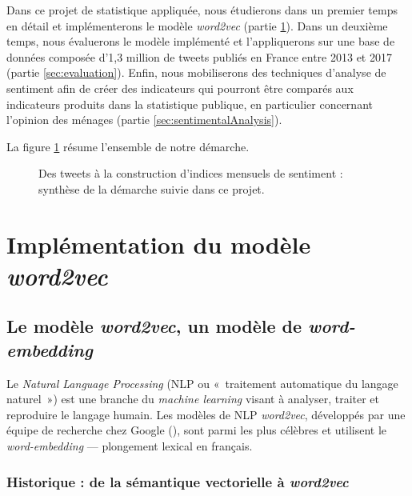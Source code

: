 \documentclass[11pt,french,french]{article}
\begin{document}
Dans ce projet de statistique appliquée, nous étudierons dans un premier
temps en détail et implémenterons le modèle \emph{word2vec} (partie
\ref{sec:word2vec}). Dans un deuxième temps, nous évaluerons le modèle
implémenté et l'appliquerons sur une base de données composée d'1,3
million de tweets publiés en France entre 2013 et 2017 (partie
\ref{sec:evaluation}). Enfin, nous mobiliserons des techniques d'analyse
de sentiment afin de créer des indicateurs qui pourront être comparés
aux indicateurs produits dans la statistique publique, en particulier
concernant l'opinion des ménages (partie \ref{sec:sentimentalAnalysis}).

La figure \ref{fig:schemaRecap} résume l'ensemble de notre démarche.

\vspace{2cm}

\begin{figure}[!htb]

\captionsetup{margin=0cm,format=hang,justification=justified}
\caption{Des tweets à la construction d'indices mensuels de sentiment : synthèse de la démarche suivie dans ce projet.}\label{fig:schemaRecap}
\end{figure}

\newpage

\section{\texorpdfstring{Implémentation du modèle
\emph{word2vec}}{Implémentation du modèle word2vec}}\label{sec:word2vec}

\subsection{\texorpdfstring{Le modèle \emph{word2vec}, un modèle de
\emph{word-embedding}}{Le modèle word2vec, un modèle de word-embedding}}\label{le-moduxe8le-word2vec-un-moduxe8le-de-word-embedding}

Le \emph{Natural Language Processing} (NLP ou «~traitement automatique
du langage naturel~») est une branche du \emph{machine learning} visant
à analyser, traiter et reproduire le langage humain. Les modèles de NLP
\emph{word2vec}, développés par une équipe de recherche chez Google
(\cite{Mikolov}), sont parmi les plus célèbres et utilisent le
\emph{word-embedding} --- plongement lexical en français.

\subsubsection{\texorpdfstring{Historique : de la sémantique vectorielle
à
\emph{word2vec}}{Historique : de la sémantique vectorielle à word2vec}}\label{historique-de-la-suxe9mantique-vectorielle-uxe0-word2vec}
\end{document}
